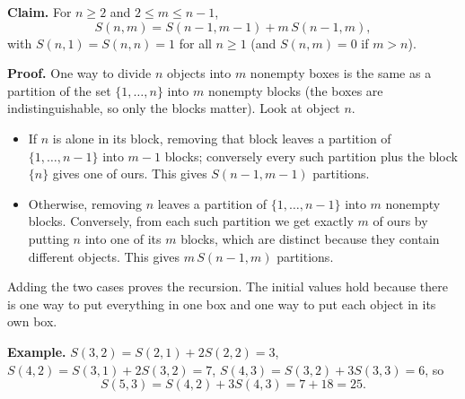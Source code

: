 \textbf{Claim.} For $n\ge2$ and $2\le m\le n-1$,
\[
S(n,m)=S(n-1,m-1)+m\,S(n-1,m),
\]
with $S(n,1)=S(n,n)=1$ for all $n\ge1$ (and $S(n,m)=0$ if $m>n$).

\textbf{Proof.} One way to divide $n$ objects into $m$ nonempty boxes is the same as a partition of the set $\{1,\dots,n\}$ into $m$ nonempty blocks (the boxes are indistinguishable, so only the blocks matter). Look at object $n$.
\begin{itemize}
\item If $n$ is alone in its block, removing that block leaves a partition of $\{1,\dots,n-1\}$ into $m-1$ blocks; conversely every such partition plus the block $\{n\}$ gives one of ours. This gives $S(n-1,m-1)$ partitions.
\item Otherwise, removing $n$ leaves a partition of $\{1,\dots,n-1\}$ into $m$ nonempty blocks. Conversely, from each such partition we get exactly $m$ of ours by putting $n$ into one of its $m$ blocks, which are distinct because they contain different objects. This gives $m\,S(n-1,m)$ partitions.
\end{itemize}
Adding the two cases proves the recursion. The initial values hold because there is one way to put everything in one box and one way to put each object in its own box.

\textbf{Example.} $S(3,2)=S(2,1)+2S(2,2)=3$, $S(4,2)=S(3,1)+2S(3,2)=7$, $S(4,3)=S(3,2)+3S(3,3)=6$, so
\[
S(5,3)=S(4,2)+3S(4,3)=7+18=\boxed{25}.
\]
